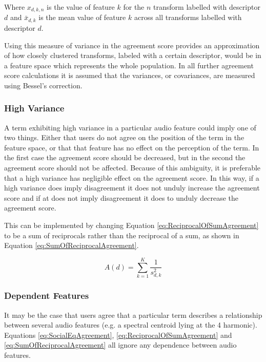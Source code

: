 			Where $x_{d,k,n}$ is the value of feature $k$ for the $n$ transform labelled with
			descriptor $d$ and $\bar{x}_{d,k}$ is the mean value of feature $k$ across all transforms labelled
			with descriptor $d$.

			Using this measure of variance in the agreement score provides an approximation of how closely
			clustered transforms, labeled with a certain descriptor, would be in a feature space which
			represents the whole population. In all further agreement score calculations it is assumed that the
			variances, or covariances, are measured using Bessel's correction.

		\subsubsection*{High Variance}
			A term exhibiting high variance in a particular audio feature could imply one of two things. Either
			that users do not agree on the position of the term in the feature space, or that that feature has
			no effect on the perception of the term. In the first case the agreement score should be decreased,
			but in the second the agreement score should not be affected. Because of this ambiguity, it is
			preferable that a high variance has negligible effect on the agreement score. In this way, if a
			high variance does imply disagreement it does not unduly increase the agreement score and if at
			does not imply disagreement it does to unduly decrease the agreement score.
			
			This can be implemented by changing Equation \ref{eq:ReciprocalOfSumAgreement} to be a sum of
			reciprocals rather than the reciprocal of a sum, as shown in Equation
			\ref{eq:SumOfReciprocalAgreement}.

			\begin{equation}
				A(d) = \sum_{k = 1}^{K} \frac{1}{s_{d,k}^{2}}
				\label{eq:SumOfReciprocalAgreement}
			\end{equation}

		\subsubsection*{Dependent Features}
			It may be the case that users agree that a particular term describes a relationship between several
			audio features (e.g. a spectral centroid lying at the 4 harmonic). Equations
			\ref{eq:SocialEqAgreement}, \ref{eq:ReciprocalOfSumAgreement} and \ref{eq:SumOfReciprocalAgreement}
			all ignore any dependence between audio features.

